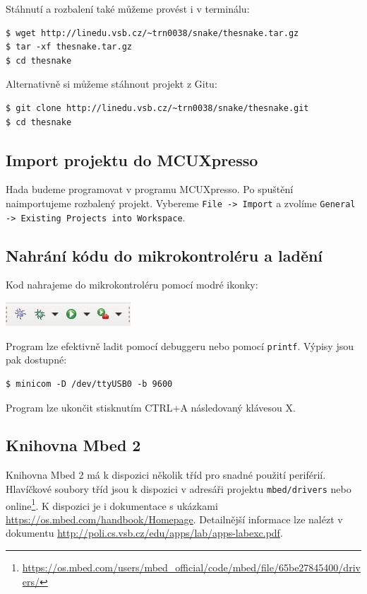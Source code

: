 \documentclass[12pt]{article}
\begin{document}
Stáhnutí a rozbalení také můžeme provést i v terminálu:
\begin{verbatim}
$ wget http://linedu.vsb.cz/~trn0038/snake/thesnake.tar.gz
$ tar -xf thesnake.tar.gz
$ cd thesnake 
\end{verbatim}

Alternativně si můžeme stáhnout projekt z Gitu:
\begin{verbatim}
$ git clone http://linedu.vsb.cz/~trn0038/snake/thesnake.git
$ cd thesnake
\end{verbatim}

\subsection{Import projektu do MCUXpresso}
Hada budeme programovat v programu MCUXpresso.
Po spuštění naimportujeme rozbalený projekt.
Vybereme \texttt{File -> Import} a zvolíme \texttt{General -> Existing Projects into Workspace}.

\subsection{Nahrání kódu do mikrokontroléru a ladění}
Kod nahrajeme do mikrokontroléru pomocí modré ikonky:

\begin{center}
\includegraphics{figures/blue-debug.jpg}
\end{center}

Program lze efektivně ladit pomocí debuggeru nebo pomocí \texttt{printf}.
Výpisy jsou pak dostupné:
\begin{verbatim}
$ minicom -D /dev/ttyUSB0 -b 9600
\end{verbatim}
Program lze ukončit stisknutím \textsc{CTRL+A} následovaný klávesou \textsc{X}.

\subsection{Knihovna Mbed 2}
Knihovna Mbed 2 má k dispozici několik tříd pro snadné použití periférií.
Hlavíčkové soubory tříd jsou k dispozici v adresáři projektu \texttt{mbed/drivers} nebo online\footnote{\url{https://os.mbed.com/users/mbed_official/code/mbed/file/65be27845400/drivers/}}.
K dispozici je i dokumentace s ukázkami \url{https://os.mbed.com/handbook/Homepage}.
Detailnější informace lze nalézt v dokumentu \url{http://poli.cs.vsb.cz/edu/apps/lab/apps-labexc.pdf}.
\end{document}
